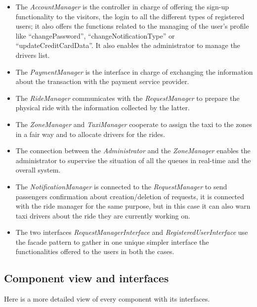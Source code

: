 \documentclass[a4paper,11pt]{report} %
\begin{document}
	\begin{itemize}
		\renewcommand{\labelitemi}{$\Rightarrow$}
		\item The \textit{AccountManager} is the controller in charge of offering the sign-up functionality to the visitors, the login to all the different types of registered users; it also offers the functions related to the managing of the user's profile like ``changePassword'', ``changeNotificationType'' or ``updateCreditCardData''. It also enables the administrator to  manage the drivers list.
		\item The \textit{PaymentManager} is the interface in charge of exchanging the information about the transaction with the payment service provider.
		\item The \textit{RideManager} communicates with the \textit{RequestManager} to prepare the physical ride with the information collected by the latter.
		\item The \textit{ZoneManager} and \textit{TaxiManager} cooperate to assign the taxi to the zones in a fair way and to allocate drivers for the rides.
		\item The connection between the \textit{Administrator} and the \textit{ZoneManager} enables the administrator to supervise the situation of all the queues in real-time and the overall system.
		\item The \textit{NotificationManager} is connected to the \textit{RequestManager} to send passengers confirmation about creation/deletion of requests, it is connected with the ride manager for the same purpose, but in this case it can also warn taxi drivers about the ride they are currently working on.
		\item The two interfaces \textit{RequestManagerInterface} and \textit{RegisteredUserInterface} use the facade pattern to gather in one unique simpler interface the functionalities offered to the users in both the cases.
	\end{itemize}	
	
	\subsection{Component view and interfaces} Here is a more detailed view of every component with its interfaces.
	
	\renewcommand{\arraystretch}{1.5}
	\setlength{\tabcolsep}{6pt}
	
		
\end{document}
